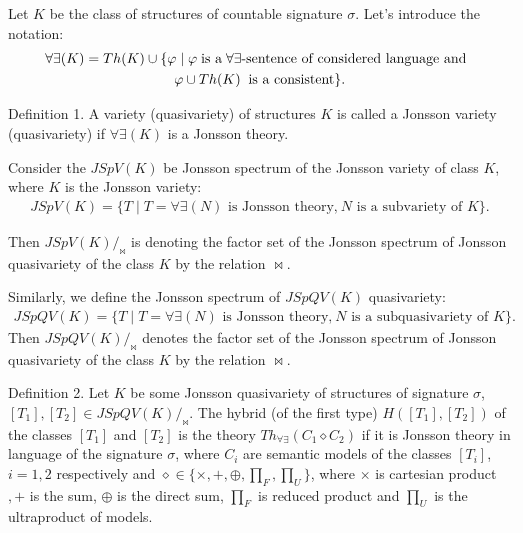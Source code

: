 \documentclass[bsl,meeting]{asl}
\newcommand{\NP}{}
\begin{document}
\thispagestyle{empty}


\NP
{}


Let $K$ be the class of structures of countable signature $\sigma$. Let's introduce the notation:
\begin{gather*}
\forall\exists(K)=Th(K)\cup\{\varphi \mid \varphi\text{\;is a\;} \forall\exists\text{-sentence of considered language and\;\;} \\ \varphi\cup Th(K) \text{\;\;is a consistent}\}.
\end{gather*}

Definition 1. A variety (quasivariety) of structures $K$ is called a Jonsson variety (quasivariety) if  $\forall\exists(K)$ is a Jonsson theory.


Consider the $JSpV(K)$ be Jonsson spectrum of the Jonsson variety of class $K$, where $K$ is the Jonsson variety:
\begin{gather*}
    JSpV(K)=\{T \mid  T=\forall\exists(N)\text{ is Jonsson theory,}
    \ N \text{ is a subvariety of } K\}.
\end{gather*}

Then $JSpV(K) /_{\bowtie}$ is denoting the factor set of the Jonsson spectrum of Jonsson quasivariety of the class $K$ by the relation $\bowtie$.

Similarly, we define the Jonsson spectrum of $JSpQV(K)$ quasivariety:
\begin{gather*}
 JSpQV(K)=\{T \mid T=\forall\exists(N)\text{ is Jonsson theory,}
    \ N \text{ is a subquasivariety of } K\}.
\end{gather*}
Then $JSpQV(K) /_{\bowtie}$ denotes the factor set of the Jonsson spectrum of Jonsson quasivariety of the class $K$ by the relation $\bowtie$.




Definition 2. Let $K$ be some Jonsson quasivariety of structures of signature $\sigma$, $[T_1], [T_2] \in JSpQV(K) /_{\bowtie}$.
The hybrid (of the first type) $ H ([T_1], [T_2]) $ of the classes $ [T_1] $ and $ [T_2] $ is the theory $ Th _ {\forall \exists} (C_ {1} \diamond C_ {2 }) $ if it is Jonsson theory in  language of the signature $ \sigma $, where $ C_ {i} $ are semantic models of the classes $ [T_i] $, $ i = 1,2 $ respectively and $ \diamond \in \{\times,  +, \oplus, \prod \limits_ {F}, \prod \limits_ {U} \} $, where $ \times $ is cartesian product$,  +  $ is the sum, $ \oplus $ is the direct sum, $ \prod \limits_ {F} $ is reduced product and $ \prod \limits_ {U} $ is the ultraproduct of models.
\end{document}
